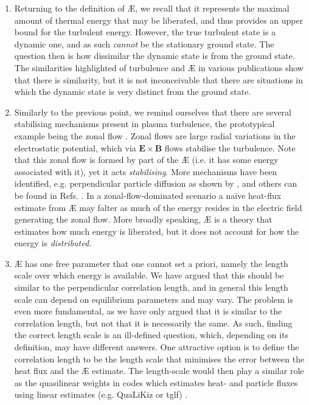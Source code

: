 \begin{enumerate}
    \item Returning to the definition of \AE{}, we recall that it represents the maximal amount of thermal energy that may be liberated, and thus provides an upper bound for the turbulent energy. However, the true turbulent state is a dynamic one, and as such {\it cannot} be the stationary ground state. The question then is how dissimilar the dynamic state is from the ground state. The similarities highlighted of turbulence and \AE{} in various publications show that there is similarity, but it is not inconceivable that there are situations in which the dynamic state is very distinct from the ground state. 
    \item Similarly to the previous point, we remind ourselves that there are several stabilising mechanisms present in plasma turbulence, the prototypical example being the zonal flow \cite{diamond2005zonal,itoh2006physics,fujisawa2008review}. Zonal flows are large radial variations in the electrostatic potential, which via $\boldsymbol{E}\times \boldsymbol{B}$ flows stabilise the turbulence. Note that this zonal flow is formed by part of the \AE{} (i.e. it has some energy associated with it), yet it acts {\it stabilising}. More mechanisms have been identified, e.g. perpendicular particle diffusion as shown by \citet{merz2008nonlinear}, and others can be found in Refs. \cite{terry2015overview,pueschel2016stellarator,hegna2018theory,faber2018stellarator}. In a zonal-flow-dominated scenario a na\"ive heat-flux estimate from \AE{} may falter as much of the energy resides in the electric field generating the zonal flow. More broadly speaking, \AE{} is a theory that estimates how much energy is liberated, but it does not account for how the energy is {\it distributed}. 
    \item \AE{} has one free parameter that one cannot set a priori, namely the length scale over which energy is available. We have argued that this should be similar to the perpendicular correlation length, and in general this length scale can depend on equilibrium parameters and may vary. The problem is even more fundamental, as we have only argued that it is similar to the correlation length, but not that it is necessarily the same. As such, finding the correct length scale is an ill-defined question, which, depending on its definition, may have different answers. One attractive option is to define the correlation length to be the length scale that minimises the error between the heat flux and the \AE{} estimate. The length-scale would then play a similar role as the quasilinear weights in codes which estimates heat- and particle fluxes using linear estimates (e.g. QuaLiKiz or {\sc tglf}) \cite{staebler2007theory,casati2009validating,citrin2012quasilinear,staebler2021verification}.
\end{enumerate}

